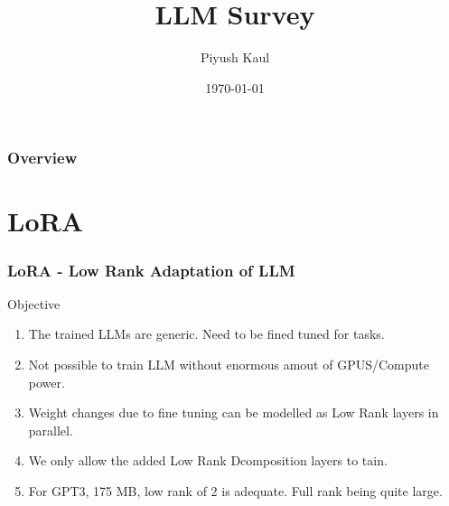 \documentclass{beamer}
\title[LLM Survey]{LLM Survey} %
\author{Piyush Kaul} %
\institute[IITD] %
{
 \\ %
\medskip
\textit{piyushkaul@ieee.org} %
}
\date{\today} %
\theoremstyle{plain}
\theoremstyle{definition}
\theoremstyle{remark}
\numberwithin{equation}{section}
\numberwithin{figure}{section}
\numberwithin{theorem}{section}
\begin{document}
\begin{frame}
\titlepage %
\end{frame}

\begin{frame}
\frametitle{Overview} %
\tableofcontents %
\end{frame}


\section{LoRA} %


\begin{frame}
\frametitle{LoRA - Low Rank Adaptation of LLM}
Objective
\begin{enumerate}
  \item The trained LLMs are generic. Need to be fined tuned for tasks. 
  \item Not possible to train LLM without enormous amout of GPUS/Compute power.
  \item Weight changes due to fine tuning can be modelled as Low Rank layers in parallel.
  \item We only allow the added Low Rank Dcomposition layers to tain.
  \item For GPT3, 175 MB, low rank of 2 is adequate. Full rank being quite large.
\end{enumerate}
\end{frame}
\end{document}
